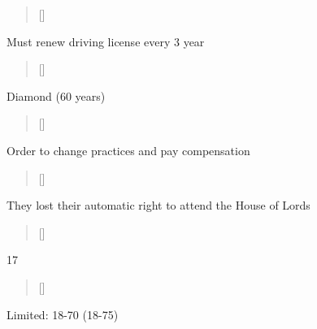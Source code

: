 \documentclass[grid,avery5371]{flashcards}
\begin{document}
\begin{flashcard}[]{%
\begin{verse}[\versewidth]
\end{verse}}

Must renew driving license every 3 year

\end{flashcard}

\begin{flashcard}[]{%
\begin{verse}[\versewidth]
\end{verse}}

Diamond (60 years)

\end{flashcard}

\begin{flashcard}[]{%
\begin{verse}[\versewidth]
\end{verse}}

Order to change practices and pay compensation

\end{flashcard}

\begin{flashcard}[]{%
\begin{verse}[\versewidth]
\end{verse}}

They lost their automatic right to attend the House of Lords

\end{flashcard}

\begin{flashcard}[]{%
\begin{verse}[\versewidth]
\end{verse}}

17

\end{flashcard}

\begin{flashcard}[]{%
\begin{verse}[\versewidth]
\end{verse}}

Limited: 18-70 (18-75)

\end{flashcard}
\end{document}
